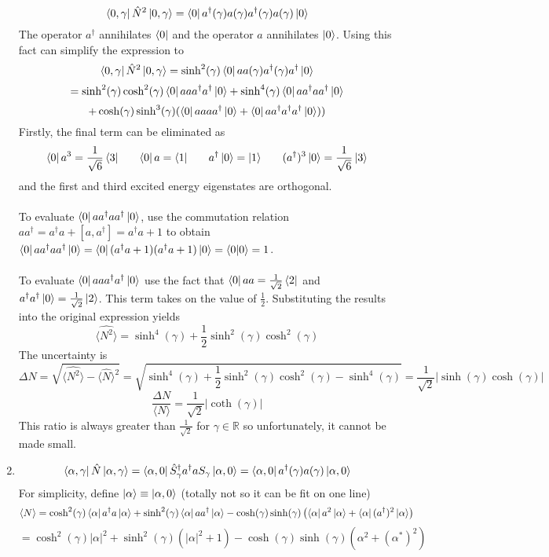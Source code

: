 \begin{sol}
\begin{enumerate}[label=\textbf{(\alph*)}]
$$\bra{0,\gamma}\hat N^2\ket{0,\gamma}=\bra0a^\dagger(\gamma)a(\gamma)a^\dagger(\gamma)a(\gamma)\ket0$$
The operator $a^\dagger$ annihilates $\bra0$ and the operator $a$ annihilates $\ket0$. Using this fact can simplify the expression to 
$$\bra{0,\gamma}\hat N^2\ket{0,\gamma}=\sinh^2(\gamma)\bra0aa(\gamma)a^\dagger(\gamma)a^\dagger\ket0$$
$$=\sinh^2(\gamma)\cosh^2(\gamma)\bra0aaa^\dagger a^\dagger\ket0+\sinh^4(\gamma)\bra0aa^\dagger aa^\dagger\ket0$$
$$+\cosh(\gamma)\sinh^3(\gamma)(\bra0aaaa^\dagger\ket0+\bra0aa^\dagger a^\dagger a^\dagger\ket0))$$  
Firstly, the final term can be eliminated as
$$\bra0 a^3=\frac{1}{\sqrt{6}}\bra 3\:\:\:\:\:\:\:\:\bra0 a=\bra1\:\:\:\:\:\:\:\:a^\dagger\ket0=\ket1\:\:\:\:\:\:\:\:(a^\dagger)^3\ket0=\frac{1}{\sqrt{6}}\ket3$$ 
and the first and third excited energy eigenstates are orthogonal. \\\\
To evaluate $\bra0aa^\dagger aa^\dagger\ket0$, use the commutation relation $aa^\dagger=a^\dagger a+[a,a^\dagger]=a^\dagger a+1$ to obtain $\bra0aa^\dagger aa^\dagger\ket0=\bra0(a^\dagger a+1)(a^\dagger a+1)\ket0=\braket{0}{0}=1$. 
\\\\To evaluate $\bra0aaa^\dagger a^\dagger\ket0$ use the fact that $\bra0 aa=\frac{1}{\sqrt{2}}\bra2$ and $a^\dagger a^\dagger\ket0=\frac{1}{\sqrt{2}}\ket2$. This term takes on the value of $\frac{1}{2}$. Substituting the results into the original expression yields
$$\langle\hat {N^2}\rangle=\sinh^4(\gamma)+\frac{1}{2}\sinh^2(\gamma)\cosh^2(\gamma)$$
The uncertainty is
$$\Delta N=\sqrt{\langle \hat {N^2}\rangle-\langle \hat N\rangle^2}=\sqrt{\sinh^4(\gamma)+\frac{1}{2}\sinh^2(\gamma)\cosh^2(\gamma)-\sinh^4(\gamma)}=\frac{1}{\sqrt{2}}|\sinh(\gamma)\cosh(\gamma)|$$
$$\frac{\Delta N}{\langle N\rangle}=\frac{1}{\sqrt{2}}|\coth(\gamma)|$$ 
This ratio is always greater than $\frac{1}{\sqrt{2}}$ for $\gamma\in\mathbb R$ so unfortunately, it cannot be made small.
\item
$$\bra{\alpha,\gamma}\hat N\ket{\alpha,\gamma}=\bra{\alpha,0}\hat S_\gamma^\dagger a^\dagger aS_\gamma\ket{\alpha,0}=\bra{\alpha,0}a^\dagger(\gamma)a(\gamma)\ket{\alpha,0}$$ 
For simplicity, define $\ket\alpha\equiv\ket{\alpha,0}$ (totally not so it can be fit on one line)
$$\langle N\rangle=\cosh^2(\gamma)\bra\alpha a^\dagger a\ket\alpha+\sinh^2(\gamma)\bra\alpha aa^\dagger\ket\alpha-\cosh(\gamma)\sinh(\gamma)\left(\bra\alpha a^2\ket\alpha+\bra\alpha (a^\dagger)^2\ket\alpha\right)$$   
$$=\cosh^2(\gamma)|\alpha|^2+\sinh^2(\gamma)(|\alpha|^2+1)-\cosh(\gamma)\sinh(\gamma)(\alpha^2+(\alpha^*)^2)$$

\end{enumerate}
\end{sol}
